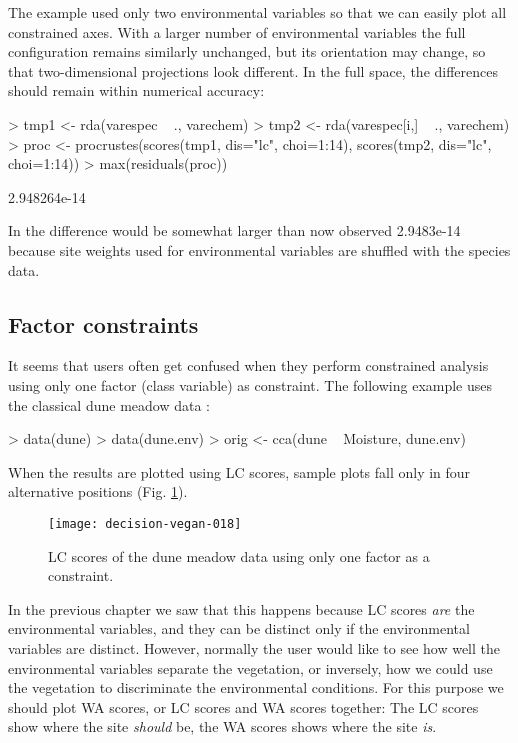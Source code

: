 \documentclass[a4paper,10pt,twocolumn]{article}
\begin{document}
The example used only two environmental variables so that we can
easily plot all constrained axes.  With a larger number of
environmental variables the full configuration remains similarly
unchanged, but its orientation may change, so that two-dimensional
projections look different.  In the full space, the differences should
remain within numerical accuracy:
\begin{Schunk}
\begin{Sinput}
> tmp1 <- rda(varespec ~ ., varechem)
> tmp2 <- rda(varespec[i,] ~ ., varechem)
> proc <- procrustes(scores(tmp1, dis="lc", choi=1:14), 
                     scores(tmp2, dis="lc", choi=1:14))
> max(residuals(proc))
\end{Sinput}
\begin{Soutput}
[1] 2.948264e-14
\end{Soutput}
\end{Schunk}
In  the difference would be somewhat larger than now
observed 2.9483e-14 because site
weights used for environmental variables are shuffled with the species
data.

\subsection{Factor constraints}

It seems that users often get confused when they perform constrained
analysis using  only one factor (class variable) as constraint.  The
following example uses the classical dune meadow data \cite{Jongman87}:
\begin{Schunk}
\begin{Sinput}
> data(dune)
> data(dune.env)
> orig <- cca(dune ~ Moisture, dune.env)
\end{Sinput}
\end{Schunk}
When the results are plotted using LC scores, sample plots fall only
in four alternative positions (Fig. \ref{fig:factorlc}).
\begin{figure}
\texttt{[image: decision-vegan-018]}
\caption{LC scores of the dune meadow data using only one factor as a
  constraint.}
\label{fig:factorlc}
\end{figure}
In the previous chapter we saw that this happens because LC scores
\emph{are} the environmental variables, and they can be distinct only
if the environmental variables are distinct.  However, normally the user
would like to see how well the environmental variables separate the
vegetation, or inversely, how we could use the vegetation to
discriminate the environmental conditions.  For this purpose we should
plot WA scores, or LC scores and WA scores together:  The LC scores
show where the site \emph{should} be, the WA scores shows where the
site \emph{is}.
\end{document}

